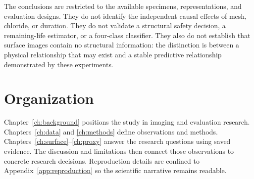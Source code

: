 The conclusions are restricted to the available specimens, representations, and evaluation designs. They do not identify the independent causal effects of mesh, chloride, or duration. They do not validate a structural safety decision, a remaining-life estimator, or a four-class classifier. They also do not establish that surface images contain no structural information: the distinction is between a physical relationship that may exist and a stable predictive relationship demonstrated by these experiments.

\section{Organization}
Chapter~\ref{ch:background} positions the study in imaging and evaluation research. Chapters~\ref{ch:data} and \ref{ch:methods} define observations and methods. Chapters~\ref{ch:surface}--\ref{ch:proxy} answer the research questions using saved evidence. The discussion and limitations then connect those observations to concrete research decisions. Reproduction details are confined to Appendix~\ref{app:reproduction} so the scientific narrative remains readable.
